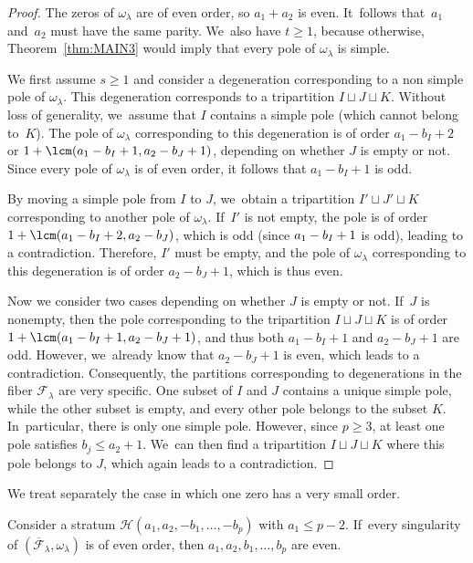 \begin{proof}
The zeros of $\omega_{\lambda}$ are of even order, so $a_{1}+a_{2}$ is even. It~follows that~$a_{1}$ and~$a_{2}$ must have the same parity. We~also have $t \geq 1$, because otherwise, Theorem~\ref{thm:MAIN3} would imply that every pole of $\omega_{\lambda}$ is simple.

We first assume $s \geq 1$ and consider a degeneration corresponding to a non simple pole of $\omega_{\lambda}$. This degeneration corresponds to a tripartition $I \sqcup J \sqcup K$. Without loss of generality, we~assume that $I$ contains a simple pole (which cannot belong to~$K$). The pole of $\omega_{\lambda}$ corresponding to this degeneration is of order $a_{1}-b_{I}+2$ or $1+\nobreak \lcm(a_{1}-\nobreak b_{I}+\nobreak 1,a_{2}-b_{J}+1)$, depending on whether $J$ is empty or not. Since every pole of $\omega_{\lambda}$ is of even order, it follows that $a_{1}-b_{I}+1$ is odd.

By moving a simple pole from $I$ to $J$, we~obtain a tripartition $I' \sqcup J' \sqcup K$ corresponding to another pole of $\omega_{\lambda}$. If~$I'$ is not empty, the pole is of order $1+\nobreak \lcm(a_{1}-\nobreak b_{I}+\nobreak 2,a_{2}-\nobreak b_{J})$, which is odd (since $a_{1}-\nobreak b_{I}+1$ is odd), leading to a contradiction. Therefore, $I'$ must be empty, and the pole of $\omega_{\lambda}$ corresponding to this degeneration is of order $a_{2}-b_{J}+1$, which is thus even.

Now we consider two cases depending on whether $J$ is empty or not. If~$J$ is nonempty, then the pole corresponding to the tripartition $I \sqcup J \sqcup K$ is of order $1+\lcm(a_{1}-b_{I}+1,a_{2}-b_{J}+1)$, and thus both $a_{1}-b_{I}+1$ and $a_{2}-b_{J}+1$ are odd. However, we~already know that $a_{2}-b_{J}+1$ is even, which leads to a contradiction. Consequently, the partitions corresponding to degenerations in the fiber $\mathcal{F}_{\lambda}$ are very specific. One subset of $I$ and $J$ contains a unique simple pole, while the other subset is empty, and every other pole belongs to the subset $K$. In~particular, there is only one simple pole. However, since $p \geq 3$, at least one pole satisfies $b_{j} \leq a_{2}+1$. We~can then find a tripartition $I \sqcup J \sqcup K$ where this pole belongs to $J$, which again leads to a contradiction.
\end{proof}

We treat separately the case in which one zero has a very small order.

\begin{prop}\label{prop:EvenEven1}
Consider a stratum $\mathcal{H}(a_{1},a_{2},-b_{1},\dots,-b_{p})$ with $a_{1} \leq p-2$. If~every singularity of $(\overline{\mathcal{F}}_{\lambda},\omega_{\lambda})$ is of even order, then $a_{1},a_{2},b_{1},\dots,b_{p}$ are even.
\end{prop}

